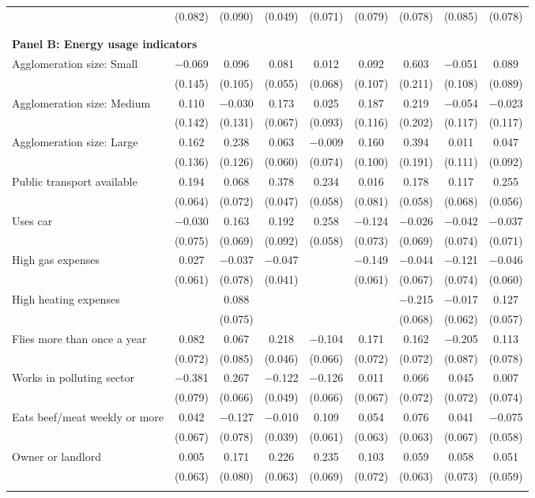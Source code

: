 \begin{tabular}{@{\extracolsep{5pt}}lcccccccc}
  & (0.082) & (0.090) & (0.049) & (0.071) & (0.079) & (0.078) & (0.085) & (0.078) \\ 
 \\[1ex] \hline \\[1ex]
\multicolumn{ 9 }{l}{\textbf{ Panel B: Energy usage indicators }} \\
  Agglomeration size: Small & $-$0.069 & 0.096 & 0.081 & 0.012 & 0.092 & 0.603 & $-$0.051 & 0.089 \\ 
  & (0.145) & (0.105) & (0.055) & (0.068) & (0.107) & (0.211) & (0.108) & (0.089) \\ 
  Agglomeration size: Medium & 0.110 & $-$0.030 & 0.173 & 0.025 & 0.187 & 0.219 & $-$0.054 & $-$0.023 \\ 
  & (0.142) & (0.131) & (0.067) & (0.093) & (0.116) & (0.202) & (0.117) & (0.117) \\ 
  Agglomeration size: Large & 0.162 & 0.238 & 0.063 & $-$0.009 & 0.160 & 0.394 & 0.011 & 0.047 \\ 
  & (0.136) & (0.126) & (0.060) & (0.074) & (0.100) & (0.191) & (0.111) & (0.092) \\ 
  Public transport available & 0.194 & 0.068 & 0.378 & 0.234 & 0.016 & 0.178 & 0.117 & 0.255 \\ 
  & (0.064) & (0.072) & (0.047) & (0.058) & (0.081) & (0.058) & (0.068) & (0.056) \\ 
  Uses car & $-$0.030 & 0.163 & 0.192 & 0.258 & $-$0.124 & $-$0.026 & $-$0.042 & $-$0.037 \\ 
  & (0.075) & (0.069) & (0.092) & (0.058) & (0.073) & (0.069) & (0.074) & (0.071) \\ 
  High gas expenses & 0.027 & $-$0.037 & $-$0.047 &  & $-$0.149 & $-$0.044 & $-$0.121 & $-$0.046 \\ 
  & (0.061) & (0.078) & (0.041) &  & (0.061) & (0.067) & (0.074) & (0.060) \\ 
  High heating expenses &  & 0.088 &  &  &  & $-$0.215 & $-$0.017 & 0.127 \\ 
  &  & (0.075) &  &  &  & (0.068) & (0.062) & (0.057) \\ 
  Flies more than once a year & 0.082 & 0.067 & 0.218 & $-$0.104 & 0.171 & 0.162 & $-$0.205 & 0.113 \\ 
  & (0.072) & (0.085) & (0.046) & (0.066) & (0.072) & (0.072) & (0.087) & (0.078) \\ 
  Works in polluting sector & $-$0.381 & 0.267 & $-$0.122 & $-$0.126 & 0.011 & 0.066 & 0.045 & 0.007 \\ 
  & (0.079) & (0.066) & (0.049) & (0.066) & (0.067) & (0.072) & (0.072) & (0.074) \\ 
  Eats beef/meat weekly or more & 0.042 & $-$0.127 & $-$0.010 & 0.109 & 0.054 & 0.076 & 0.041 & $-$0.075 \\ 
  & (0.067) & (0.078) & (0.039) & (0.061) & (0.063) & (0.063) & (0.067) & (0.058) \\ 
  Owner or landlord & 0.005 & 0.171 & 0.226 & 0.235 & 0.103 & 0.059 & 0.058 & 0.051 \\ 
  & (0.063) & (0.080) & (0.063) & (0.069) & (0.072) & (0.063) & (0.073) & (0.059) \\ 
 \hline \\[-1.8ex] 


\end{tabular}
